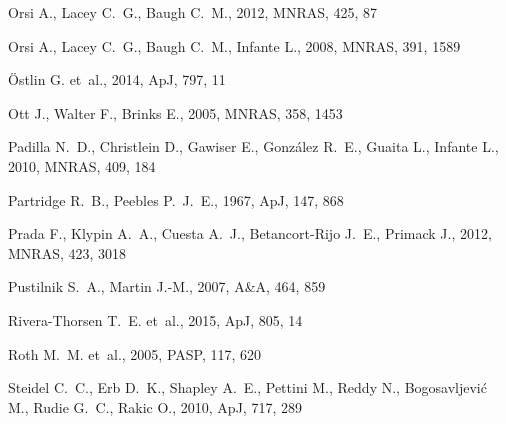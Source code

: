 \documentclass[a4,useAMS,usenatbib,usegraphicx]{mn2e}
\newcommand{\apj}{ApJ}
\newcommand{\mnras}{MNRAS}
\newcommand{\aap}{A\&A}
\newcommand{\pasp}{PASP}
\begin{document}
\begin{thebibliography}{}
{Orsi} A.,  {Lacey} C.~G.,    {Baugh} C.~M.,  2012, \mnras, 425, 87

{Orsi} A.,  {Lacey} C.~G.,  {Baugh} C.~M.,    {Infante} L.,  2008, \mnras, 391,
  1589

{{\"O}stlin} G.  et~al., 2014, \apj, 797, 11

{Ott} J.,  {Walter} F.,    {Brinks} E.,  2005, \mnras, 358, 1453

{Padilla} N.~D.,  {Christlein} D.,  {Gawiser} E.,  {Gonz{\'a}lez} R.~E.,
  {Guaita} L.,    {Infante} L.,  2010, \mnras, 409, 184

{Partridge} R.~B.,  {Peebles} P.~J.~E.,  1967, \apj, 147, 868

{Prada} F.,  {Klypin} A.~A.,  {Cuesta} A.~J.,  {Betancort-Rijo} J.~E.,
  {Primack} J.,  2012, \mnras, 423, 3018

{Pustilnik} S.~A.,  {Martin} J.-M.,  2007, \aap, 464, 859

{Rivera-Thorsen} T.~E.  et~al., 2015, \apj, 805, 14

{Roth} M.~M.  et~al., 2005, \pasp, 117, 620

{Steidel} C.~C.,  {Erb} D.~K.,  {Shapley} A.~E.,  {Pettini} M.,  {Reddy} N.,
  {Bogosavljevi{\'c}} M.,  {Rudie} G.~C.,    {Rakic} O.,  2010, \apj, 717, 289


\end{thebibliography}
\end{document}
